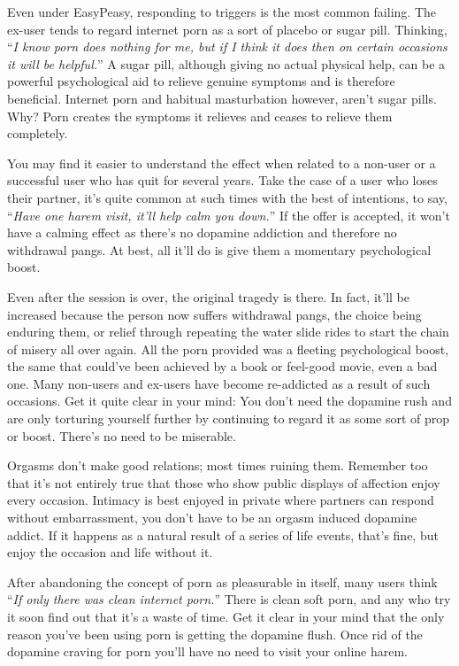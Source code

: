 \documentclass[
]{book}
\begin{document}
Even under EasyPeasy, responding to triggers is the most common failing. The ex-user tends to regard internet porn as a sort of placebo or sugar pill. Thinking, ``\emph{I know porn does nothing for me, but if I think it does then on certain occasions it will be helpful.}'' A sugar pill, although giving no actual physical help, can be a powerful psychological aid to relieve genuine symptoms and is therefore beneficial. Internet porn and habitual masturbation however, aren't sugar pills. Why? Porn creates the symptoms it relieves and ceases to relieve them completely.

You may find it easier to understand the effect when related to a non-user or a successful user who has quit for several years. Take the case of a user who loses their partner, it's quite common at such times with the best of intentions, to say, ``\emph{Have one harem visit, it'll help calm you down.}'' If the offer is accepted, it won't have a calming effect as there's no dopamine addiction and therefore no withdrawal pangs. At best, all it'll do is give them a momentary psychological boost.

Even after the session is over, the original tragedy is there. In fact, it'll be increased because the person now suffers withdrawal pangs, the choice being enduring them, or relief through repeating the water slide rides to start the chain of misery all over again. All the porn provided was a fleeting psychological boost, the same that could've been achieved by a book or feel-good movie, even a bad one. Many non-users and ex-users have become re-addicted as a result of such occasions. Get it quite clear in your mind: You don't need the dopamine rush and are only torturing yourself further by continuing to regard it as some sort of prop or boost. There's no need to be miserable.

Orgasms don't make good relations; most times ruining them. Remember too that it's not entirely true that those who show public displays of affection enjoy every occasion. Intimacy is best enjoyed in private where partners can respond without embarrassment, you don't have to be an orgasm induced dopamine addict. If it happens as a natural result of a series of life events, that's fine, but enjoy the occasion and life without it.

After abandoning the concept of porn as pleasurable in itself, many users think ``\emph{If only there was clean internet porn.}'' There is clean soft porn, and any who try it soon find out that it's a waste of time. Get it clear in your mind that the only reason you've been using porn is getting the dopamine flush. Once rid of the dopamine craving for porn you'll have no need to visit your online harem.
\end{document}
